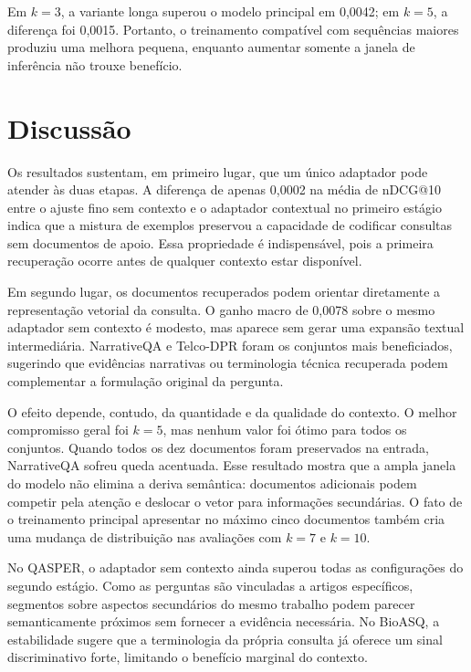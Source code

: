 Em $k=3$, a variante longa superou o modelo principal em 0,0042; em $k=5$, a diferença foi 0,0015. Portanto, o treinamento compatível com sequências maiores produziu uma melhora pequena, enquanto aumentar somente a janela de inferência não trouxe benefício.

\section{Discussão}
\label{sec:ctx-emb-discussao}

Os resultados sustentam, em primeiro lugar, que um único adaptador pode atender às duas etapas. A diferença de apenas 0,0002 na média de nDCG@10 entre o ajuste fino sem contexto e o adaptador contextual no primeiro estágio indica que a mistura de exemplos preservou a capacidade de codificar consultas sem documentos de apoio. Essa propriedade é indispensável, pois a primeira recuperação ocorre antes de qualquer contexto estar disponível.

Em segundo lugar, os documentos recuperados podem orientar diretamente a representação vetorial da consulta. O ganho macro de 0,0078 sobre o mesmo adaptador sem contexto é modesto, mas aparece sem gerar uma expansão textual intermediária. NarrativeQA e Telco-DPR foram os conjuntos mais beneficiados, sugerindo que evidências narrativas ou terminologia técnica recuperada podem complementar a formulação original da pergunta.

O efeito depende, contudo, da quantidade e da qualidade do contexto. O melhor compromisso geral foi $k=5$, mas nenhum valor foi ótimo para todos os conjuntos. Quando todos os dez documentos foram preservados na entrada, NarrativeQA sofreu queda acentuada. Esse resultado mostra que a ampla janela do modelo não elimina a deriva semântica: documentos adicionais podem competir pela atenção e deslocar o vetor para informações secundárias. O fato de o treinamento principal apresentar no máximo cinco documentos também cria uma mudança de distribuição nas avaliações com $k=7$ e $k=10$.

No QASPER, o adaptador sem contexto ainda superou todas as configurações do segundo estágio. Como as perguntas são vinculadas a artigos específicos, segmentos sobre aspectos secundários do mesmo trabalho podem parecer semanticamente próximos sem fornecer a evidência necessária. No BioASQ, a estabilidade sugere que a terminologia da própria consulta já oferece um sinal discriminativo forte, limitando o benefício marginal do contexto.

